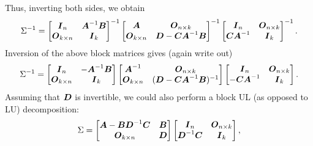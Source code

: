 Thus, inverting both sides, we obtain
\begin{equation*}
	\Sigma^{-1} =
	\begin{bmatrix}
		\boldsymbol{I}_n            & \boldsymbol{A}^{-1} \boldsymbol{B} \\
		\boldsymbol{O}_{k \times n} & \boldsymbol{I}_k
	\end{bmatrix}^{-1}
	\begin{bmatrix}
		\boldsymbol{A}              & \boldsymbol{O}_{n \times k}                      \\
		\boldsymbol{O}_{k \times n} & \boldsymbol{D} - \boldsymbol{C} \boldsymbol{A}^{-1} \boldsymbol{B}
	\end{bmatrix}^{-1}
	\begin{bmatrix}
		\boldsymbol{I}_n             & \boldsymbol{O}_{n \times k} \\
		\boldsymbol{C} \boldsymbol{A}^{-1} & \boldsymbol{I}_k
	\end{bmatrix}^{-1}.
\end{equation*}
Inversion of the above block matrices gives (again write out)
\begin{equation} \label{eq:BlockInverseIntermed}
	\Sigma^{-1} =
	\begin{bmatrix}
		\boldsymbol{I}_n            & -\boldsymbol{A}^{-1} \boldsymbol{B} \\
		\boldsymbol{O}_{k \times n} & \boldsymbol{I}_k
	\end{bmatrix}
	\begin{bmatrix}
		\boldsymbol{A}^{-1}         & \boldsymbol{O}_{n \times k}                             \\
		\boldsymbol{O}_{k \times n} & (\boldsymbol{D} - \boldsymbol{C} \boldsymbol{A}^{-1} \boldsymbol{B})^{-1}
	\end{bmatrix}
	\begin{bmatrix}
		\boldsymbol{I}_n              & \boldsymbol{O}_{n \times k} \\
		-\boldsymbol{C} \boldsymbol{A}^{-1} & \boldsymbol{I}_k
	\end{bmatrix}.
\end{equation}
Assuming that \(\boldsymbol{D}\) is invertible, we could also perform a block UL (as opposed to LU) decomposition:
\begin{equation} \label{eq:BlockUL}
	\Sigma =
	\begin{bmatrix}
		\boldsymbol{A} - \boldsymbol{B} \boldsymbol{D}^{-1} \boldsymbol{C} & \boldsymbol{B} \\
		\boldsymbol{O}_{k \times n}                      & \boldsymbol{D}
	\end{bmatrix}
	\begin{bmatrix}
		\boldsymbol{I}_n             & \boldsymbol{O}_{n \times k} \\
		\boldsymbol{D}^{-1} \boldsymbol{C} & \boldsymbol{I}_k
	\end{bmatrix},
\end{equation}
